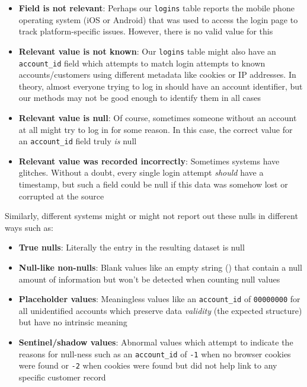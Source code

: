 \documentclass[
]{krantz}
\providecommand{\tightlist}{%
  \setlength{\itemsep}{0pt}\setlength{\parskip}{0pt}}
\begin{document}
\begin{itemize}
\tightlist
\item
  \textbf{Field is not relevant}: Perhaps our \texttt{logins} table reports the mobile phone operating system (iOS or Android) that was used to access the login page to track platform-specific issues. However, there is no valid value for this
\item
  \textbf{Relevant value is not known}: Our \texttt{logins} table might also have an \texttt{account\_id} field which attempts to match login attempts to known accounts/customers using different metadata like cookies or IP addresses. In theory, almost everyone trying to log in should have an account identifier, but our methods may not be good enough to identify them in all cases
\item
  \textbf{Relevant value is null}: Of course, sometimes someone without an account at all might try to log in for some reason. In this case, the correct value for an \texttt{account\_id} field truly \emph{is} null
\item
  \textbf{Relevant value was recorded incorrectly}: Sometimes systems have glitches. Without a doubt, every single login attempt \emph{should} have a timestamp, but such a field could be null if this data was somehow lost or corrupted at the source
\end{itemize}

Similarly, different systems might or might not report out these nulls in different ways such as:

\begin{itemize}
\tightlist
\item
  \textbf{True nulls}: Literally the entry in the resulting dataset is null
\item
  \textbf{Null-like non-nulls}: Blank values like an empty string (\texttt{\textquotesingle{}\textquotesingle{}}) that contain a null amount of information but won't be detected when counting null values
\item
  \textbf{Placeholder values}: Meaningless values like an \texttt{account\_id} of \texttt{00000000} for all unidentified accounts which preserve data \emph{validity} (the expected structure) but have no intrinsic meaning
\item
  \textbf{Sentinel/shadow values}: Abnormal values which attempt to indicate the reasons for null-ness such as an \texttt{account\_id} of \texttt{-1} when no browser cookies were found or \texttt{-2} when cookies were found but did not help link to any specific customer record
\end{itemize}
\end{document}
